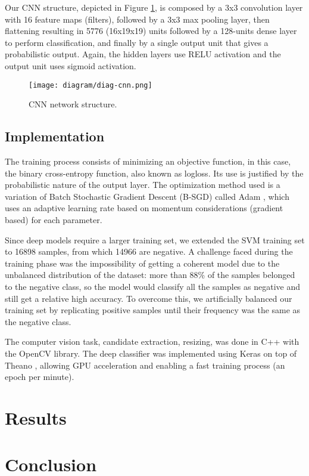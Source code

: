         Our CNN structure, depicted in Figure \ref{fig:diag-cnn}, is composed by a 3x3 convolution layer with 16 feature maps (filters), followed by a 3x3 max pooling layer, then flattening resulting in 5776 (16x19x19) units followed by a 128-units dense layer to perform classification, and finally by a single output unit that gives a probabilistic output. Again, the hidden layers use RELU activation and the output unit uses sigmoid activation.

        \begin{figure}
        \centering
        \texttt{[image: diagram/diag-cnn.png]}
        \caption{CNN network structure.}
        \label{fig:diag-cnn}
        \end{figure}

    \subsection{Implementation}
        The training process consists of minimizing an objective function, in this case, the binary cross-entropy function, also known as logloss. Its use is justified by the probabilistic nature of the output layer. The optimization method used is a variation of Batch Stochastic Gradient Descent (B-SGD) called Adam \cite{kingma2014adam}, which uses an adaptive learning rate based on momentum considerations (gradient based) for each parameter.

        Since deep models require a larger training set, we extended the SVM training set to 16898 samples, from which 14966 are negative. A challenge faced during the training phase was the impossibility of getting a coherent model due to the unbalanced distribution of the dataset: more than 88\% of the samples belonged to the negative class, so the model would classify all the samples as negative and still get a relative high accuracy. To overcome this, we artificially balanced our training set by replicating positive samples until their frequency was the same as the negative class.

        The computer vision task, candidate extraction, resizing, was done in C++ with the OpenCV library. The deep classifier was implemented using Keras \cite{keras} on top of Theano \cite{theano}, allowing GPU acceleration and enabling a fast training process (an epoch per minute).


\section{Results}
\label{sec:results}

\section{Conclusion}
\label{sec:conclusion}
